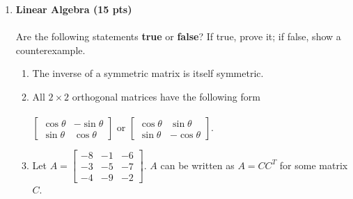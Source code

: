 \begin{enumerate}
    \item \textbf{Linear Algebra  (15 pts)}\\\\
        Are the following statements {\bf true} or {\bf false}? If true, prove it; if false, show a counterexample.
        \begin{enumerate}
        \item The inverse of a symmetric matrix is itself symmetric.
        
        \item All $2 \times 2$ orthogonal matrices have the following form\\\\
	    $\left[ \begin{array}{cc}
	    \cos \theta & -\sin\theta \\ \sin \theta & \cos \theta
	    \end{array} \right]$ or 
	    	    $\left[ \begin{array}{cc}
	    \cos \theta & \sin\theta \\ \sin \theta & -\cos \theta
	    \end{array} \right]$. 
	    \item Let $A=\left[\begin{array}{ccc} -8 &-1 &-6\\ -3& -5& -7\\ -4 & -9 & -2  \end{array}\right]$. $A$ can be written as $A=CC^T$ for some matrix $C$.
        \end{enumerate}
\solution{   
    
       
    }  
    

\end{enumerate}
